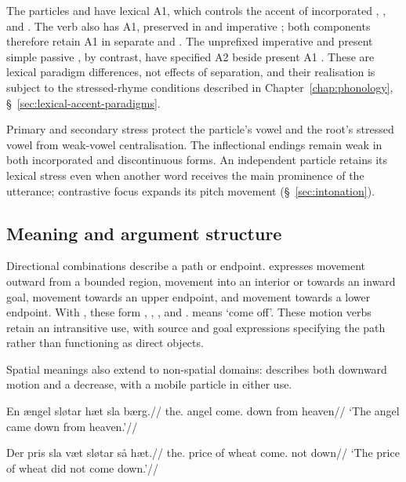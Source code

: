 The particles  and  have lexical A1, which controls the accent of incorporated , , and . The verb  also has A1, preserved in  and imperative ; both components therefore retain A1 in separate  and . The unprefixed imperative  and present simple passive , by contrast, have specified A2 beside present A1 . These are lexical paradigm differences, not effects of separation, and their realisation is subject to the stressed-rhyme conditions described in Chapter~\ref{chap:phonology}, \S~\ref{sec:lexical-accent-paradigms}.

Primary and secondary stress protect the particle's vowel and the root's stressed vowel from weak-vowel centralisation. The inflectional endings remain weak in both incorporated and discontinuous forms. An independent particle retains its lexical stress even when another word receives the main prominence of the utterance; contrastive focus expands its pitch movement (\S~\ref{sec:intonation}).

\subsection{Meaning and argument structure}
\label{sec:particle-semantics}

Directional combinations describe a path or endpoint.  expresses movement outward from a bounded region,  movement into an interior or towards an inward goal,  movement towards an upper endpoint, and  movement towards a lower endpoint. With , these form , , , and .  means `come off'. These motion verbs retain an intransitive use, with source and goal expressions specifying the path rather than functioning as direct objects.

Spatial meanings also extend to non-spatial domains:  describes both downward motion and a decrease, with a mobile particle in either use.

\pex
\begingl
\gla En ængel sløtar hæt sla bærg.//
\glb the.\M{} angel come.\Pst{} down from heaven//
\glft `The angel came down from heaven.'//
\endgl
\xe

\pex
\begingl
\gla Der pris sla væt sløtar så hæt.//
\glb the.\Pl{} price of wheat come.\Pst{} not down//
\glft `The price of wheat did not come down.'//
\endgl
\xe

